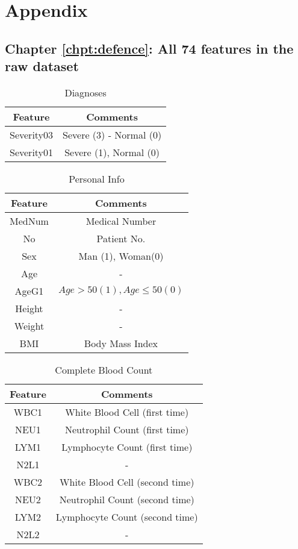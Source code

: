 \chapter{Appendix}

\section{Chapter \ref{chpt:defence}: All 74 features in the raw dataset}

\begin{table}[H]
\centering
\begin{tabular}{@{}cc@{}}
\toprule
Feature                   & Comments  \\ 
\toprule
Severity03 & Severe (3) - Normal (0) \\
Severity01 & Severe (1), Normal (0)	\\
\bottomrule
\end{tabular}
\caption{Diagnoses}
\end{table}

\begin{table}[H]
\centering
\begin{tabular}{@{}cc@{}}
\toprule
Feature                   & Comments \\ 
\toprule
MedNum           & Medical Number  \\
No            & Patient No.         \\  
Sex  & Man (1), Woman(0)          \\  
Age	& - \\
AgeG1 &	$Age > 50 (1), Age \leq 50 (0)$ \\
Height &  -	 \\
Weight &  - \\
BMI	 & Body Mass Index   \\
\bottomrule
\end{tabular}
\caption{Personal Info}
\end{table}

\begin{table}[H]
\centering
\begin{tabular}{@{}cc@{}}
\toprule
Feature                   & Comments \\ 
\toprule
WBC1 &	White Blood Cell (first time) \\
NEU1 &	Neutrophil Count (first time) \\
LYM1 &	Lymphocyte Count (first time) \\
N2L1 &  -  \\
WBC2 &	White Blood Cell (second time)  \\
NEU2 &	Neutrophil Count (second time) \\
LYM2 &	Lymphocyte Count (second time) \\
N2L2 &  -  \\
\bottomrule
\end{tabular}
\caption{Complete Blood Count}
\end{table}

